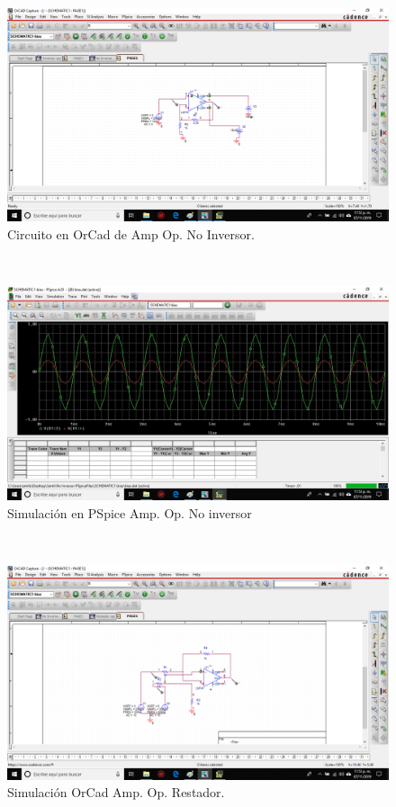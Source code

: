 \documentclass[14pt,letterpaper]{article}
\begin{document}
\
\begin{figure}[h!]
\begin{center}
\includegraphics[scale=0.5]{Simulacion-PCB/noinversor.png} 
\caption{Circuito en OrCad de Amp Op. No Inversor.}
\end{center}
\end{figure}

\
\begin{figure}[h!]
\begin{center}
\includegraphics[scale=0.5]{Simulacion-PCB/simnoinversor.png} 
\caption{Simulación en PSpice Amp. Op. No inversor}
\end{center}
\end{figure}

\
\begin{figure}[h!]
\begin{center}
\includegraphics[scale=0.5]{Simulacion-PCB/restador.png} 
\caption{Simulación OrCad Amp. Op. Restador.}
\end{center}
\end{figure}
\end{document}
